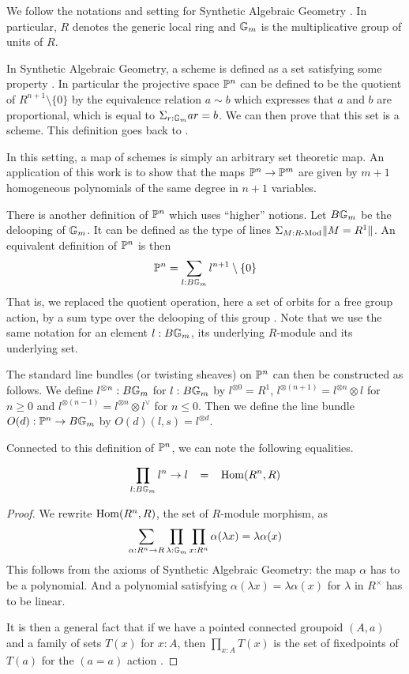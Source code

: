 We follow the notations and setting for Synthetic Algebraic Geometry \cite{draft}.
In particular, $R$ denotes the generic local ring and $\mathbb{G}_m$ is the multiplicative group of units of $R$.

In Synthetic Algebraic Geometry, a scheme is defined as a set satisfying some property \cite{draft}. In particular
the projective space $\mathbb{P}^n$ can be defined to be the quotient of $R^{n+1}\setminus\{0\}$ by the
equivalence relation $a\sim b$ which expresses that $a$ and $b$ are proportional, %
which is equal to $\Sigma_{r:\mathbb{G}_m}ar = b$. We can then prove \cite{draft}
that this set is a scheme. This definition goes back to \cite{Kock74}.

 In this setting, a map of schemes is simply an arbitrary set theoretic map. An application of this work is to show
 that the maps $\mathbb{P}^n\rightarrow \mathbb{P}^m$ are given by $m+1$ homogeneous polynomials of the same degree in $n+1$ variables.

\medskip


There is another definition of $\mathbb{P}^n$ which uses ``higher'' notions. Let $B\mathbb{G}_m$ be the delooping
of $\mathbb{G}_m$. It can be defined as the type of lines $\Sigma_{M:R\text{-}\mathrm{Mod}}\|{M=R^1}\|$.
An equivalent definition of $\mathbb{P}^n$ is then
$$
\mathbb{P}^n = \sum_{l:B\mathbb{G}_m}l^{n+1}\setminus\{0\}
$$
That is, we replaced the quotient operation, here a set of orbits for a free group action, by a sum type over the delooping of this group
\cite{Sym}.
Note that we use the same notation for an element $l : B\mathbb{G}_m$,
its underlying $R$-module and its underlying set.

The standard line bundles (or twisting sheaves) on $\mathbb{P}^n$ can then be constructed as follows.
We define $l^{\otimes n}:B\mathbb{G}_m$ for $l:B\mathbb{G}_m$ by
$l^{\otimes 0} = R^1$,
$l^{\otimes (n+1)} = l^{\otimes n}\otimes l$ for $n \geqslant 0$
and $l^{\otimes (n-1)} = l^{\otimes n}\otimes l^{\vee}$ for $n \leqslant 0$.
Then we define the line bundle $O(d):\mathbb{P}^n\rightarrow B\mathbb{G}_m$ by $O(d)(l,s) = l^{\otimes d}$.

\medskip

Connected to this definition of $\mathbb{P}^n$, we can note the following equalities.

\begin{proposition}\label{end}
  $$\prod_{l:B\mathbb{G}_m}l^n\rightarrow l \;\;\;=\;\;\; \mathrm{Hom}(R^n,R)$$
\end{proposition}

\begin{proof}
We rewrite $\mathrm{Hom}(R^n,R)$, the set of $R$-module morphism, as
$$
\sum_{\alpha:R^n\rightarrow R}\prod_{\lambda:\mathbb{G}_m}\prod_{x:R^n}\alpha(\lambda x) = \lambda \alpha(x)
$$
This follows from the axioms of Synthetic Algebraic Geometry: the map $\alpha$ has to be a polynomial. And a polynomial
satisfying $\alpha(\lambda x) = \lambda \alpha(x)$ for $\lambda$ in $R^{\times}$ has to be linear.

\medskip

It is then a general fact that if we have a pointed connected groupoid $(A,a)$ and a family of
sets $T(x)$ for $x:A$, then $\prod_{x:A}T(x)$ is the set of fixedpoints of $T(a)$ for the $(a=a)$ action
\cite{Sym}.
\end{proof}

